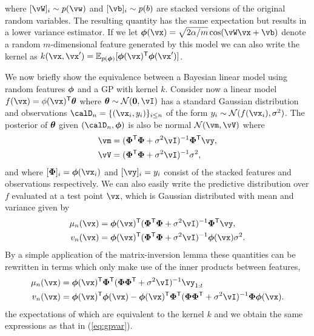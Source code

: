 where $[\vW]_i\sim p(\vw)$ and $[\vb]_i\sim p(b)$ are stacked versions of the
original random variables. The resulting quantity has the same expectation but
results in a lower variance estimator. If we let
$\vphi(\vx)=\sqrt{2\alpha/m}\cos(\vW\vx+\vb)$ denote a random $m$-dimensional
feature generated by this model we can also write the kernel as
$k(\x,\x')=\E_{p(\vphi)}[\vphi(\vx)\T\vphi(\vx')]$.

We now briefly show the equivalence between a Bayesian linear model using random
features $\boldsymbol{\phi}$ and a GP with kernel $k$. Consider now a linear model
$f(\vx)=\phi(\vx)\T\vtheta$ where $\vtheta\sim\Normal(\zero,\vI)$ has a standard
Gaussian distribution and observations $\D_n=\{(\vx_i,y_i)\}_{i\leq n}$ of the
form $y_i\sim\Normal(f(\vx_i), \sigma^2)$. The posterior of $\boldsymbol{\theta}$ given
$(\D_n,\vphi)$ is also be normal $\Normal(\vm,\vV)$ where
\begin{align*}
    \vm &= (\vPhi\T\vPhi + \sigma^2\vI)^{-1}\vPhi\T\vy, \\
    \vV &= (\vPhi\T\vPhi + \sigma^2\vI)^{-1}\sigma^2,
\end{align*}
and where $[\vPhi]_i=\vphi(\vx_i)$ and $[\vy]_i=y_i$ consist of the stacked
features and observations respectively. We can also easily write the predictive
distribution over $f$ evaluated at a test point $\vx$, which is Gaussian
distributed with mean and variance given by
\begin{align*}
    \mu_n(\vx)
    &= \vphi(\vx)\T(\vPhi\T\vPhi + \sigma^2\vI)^{-1} \vPhi\T \vy,
    \\
    v_n(\vx)
    &= \vphi(\vx)\T(\vPhi\T\vPhi + \sigma^2\vI)^{-1} \vphi(\vx) \sigma^2.
\end{align*}
By a simple application of the matrix-inversion lemma these quantities can be
rewritten in terms which only make use of the inner products between features,
\begin{align*}
    \mu_n(\vx)
    &= \vphi(\vx)\T \vPhi\T(\vPhi\vPhi\T + \sigma^2\vI)^{-1}\vy_{1:t}
    \\
    v_n(\vx)
    &= \vphi(\vx)\T\vphi(\vx)
     - \vphi(\vx)\T\vPhi\T(\vPhi\vPhi\T + \sigma^2\vI)^{-1}\vPhi\vphi(\vx).
\end{align*}
the expectations of which are equivalent to the kernel $k$ and we obtain the
same expressions as that in (\ref{eq:gpvar}). 

